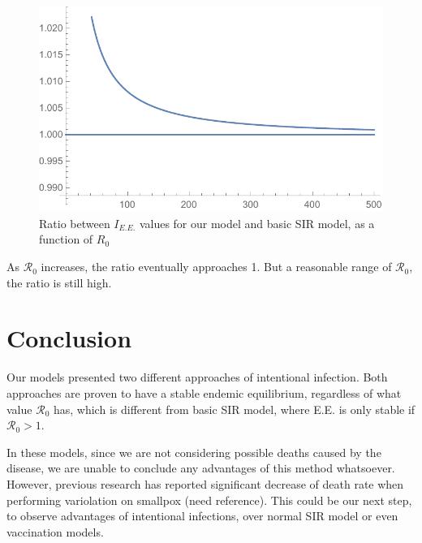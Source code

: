 \documentclass[12pt]{article}
\newcommand{\R}{\mathcal{R}}
\begin{document}
\begin{figure}[H]
  \caption{Ratio between $I_{E.E.}$ values for our model and basic SIR model, as a function of $R_0$}
  \includegraphics[width=1\textwidth]{Figures/Ratio_plot.pdf}
\end{figure}

As $\R_0$ increases, the ratio eventually approaches 1. But a reasonable range of $\R_0$, the ratio is still high.

\section{Conclusion}
\begin{flushleft}
Our models presented two different approaches of intentional infection. Both approaches are proven to have a stable endemic equilibrium, regardless of what value $\R_0$ has, which is different from basic SIR model, where E.E. is only stable if $\R_0>1$.

In these models, since we are not considering possible deaths caused by the disease, we are unable to conclude any advantages of this method whatsoever. However, previous research has reported significant decrease of death rate when performing variolation on smallpox (need reference). This could be our next step, to observe advantages of intentional infections, over normal SIR model or even vaccination models.

\end{flushleft}
\end{document}
